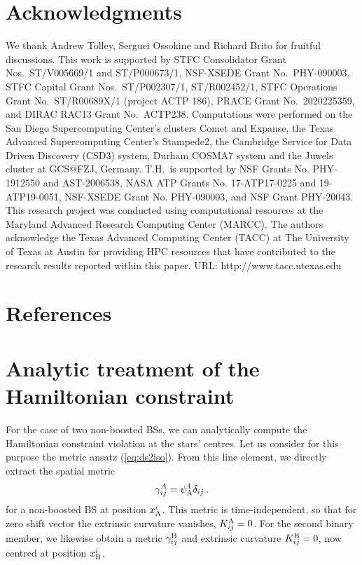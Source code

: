 \documentclass[]{iopart}
\begin{document}
\section*{Acknowledgments}
We thank Andrew Tolley, Serguei Ossokine and Richard Brito for
fruitful discussions.
This work is supported by
STFC Consolidator Grant Nos.~ST/V005669/1 and ST/P000673/1,
NSF-XSEDE Grant No.~PHY-090003,
STFC Capital Grant Nos.~ST/P002307/1, ST/R002452/1,
STFC Operations Grant No.~ST/R00689X/1 (project ACTP 186),
PRACE Grant No.~2020225359,
and
DIRAC RAC13 Grant No.~ACTP238.
Computations were performed on
the San Diego Supercomputing Center's clusters Comet and Expanse,
the Texas Advanced Supercomputing Center's Stampede2,
the Cambridge Service for Data Driven Discovery (CSD3) system,
Durham COSMA7 system and the Juwels cluster at GCS@FZJ, Germany.
T.H.~is supported by NSF Grants No. PHY-1912550 and AST-2006538,
NASA ATP Grants No. 17-ATP17-0225 and 19-ATP19-0051, NSF-XSEDE Grant
No. PHY-090003, and NSF Grant PHY-20043.  This research project was
conducted using computational resources at the Maryland Advanced
Research Computing Center (MARCC).  The authors acknowledge the
Texas Advanced Computing Center (TACC) at The University of Texas
at Austin for providing HPC resources that have contributed to the
research results reported within this paper. URL:
http://www.tacc.utexas.edu \cite{10.1145/3311790.3396656}

\section*{References}
%



\appendix

\section{Analytic treatment of the Hamiltonian constraint}
\label{sec:hamanalytic}
For the case of two non-boosted BSs, we can analytically compute
the Hamiltonian constraint violation at the stars' centres. Let us
consider for this purpose the metric ansatz (\ref{eq:ds2iso}). From
this line element, we directly extract the spatial metric
%
\begin{equation}
  \gamma_{ij}^{A} = \psi_{\rm A}^4 \delta_{ij}\,.
  \label{eqn:appendixansatzmetric}
\end{equation}
%
for a non-boosted BS at position $x_{\rm A}^i$.  This metric is
time-independent, so that for zero shift vector the extrinsic
curvature vanishes, $K_{ij}^{\rm A} = 0$.  For the second binary
member, we likewise obtain a metric $\gamma^{\rm B}_{ij}$ and
extrinsic curvature $K^{\rm B}_{ij}=0$, now centred at position
$x_{\rm B}^i$.
\end{document}
